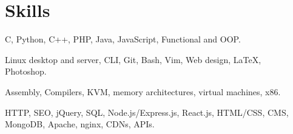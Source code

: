 \section{Skills}
{C, Python, C++, PHP, Java, JavaScript, Functional and OOP.}

{Linux desktop and server, CLI, Git, Bash, Vim, Web design, {\LaTeX},\\ Photoshop.}

{Assembly, Compilers, KVM, memory architectures, virtual machines, x86.}

{HTTP, SEO, jQuery, SQL, Node.js/Express.js, React.js, HTML/CSS, CMS, MongoDB, Apache, nginx, CDNs, APIs.}
